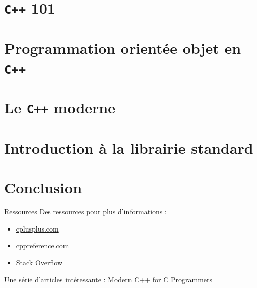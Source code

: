 \documentclass{beamer}
\begin{document}
\section{\texttt{C++} 101}
\label{sec:cpp101}



\section{Programmation orientée objet en \texttt{C++}}
\label{sec:poo}



\section{Le \texttt{C++} moderne}
\label{sec:cpp-moderne}



\section{Introduction à la librairie standard}
\label{sec:cpp-std}



\section*{Conclusion}
\label{sec:conclusion}
\begin{frame}{Ressources}
  Des ressources pour plus d'informations :
  \begin{itemize}
  \item \href{http://www.cplusplus.com/}{cplusplus.com}
  \item \href{https://en.cppreference.com/w/}{cppreference.com}
  \item \href{https://stackoverflow.com/}{Stack Overflow}
  \end{itemize}

  Une série d'articles intéressante : \href{https://ds9a.nl/articles/posts/cpp-intro/}{Modern C++ for C Programmers}
\end{frame}
\end{document}

